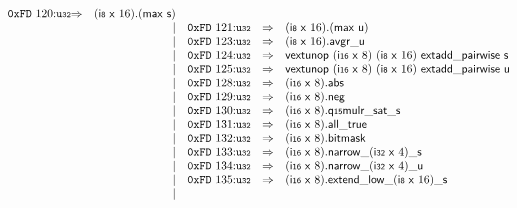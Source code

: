 $$\begin{array}{@{}l@{}rrlll@{}l@{}}
\mathtt{0xFD}~120{:}{\mathtt{u{\scriptstyle32}}} &\Rightarrow& (\mathsf{i{\scriptstyle8}}~\mathsf{x}~16) . (\mathsf{max}~\mathsf{s}) \\ &&|&
\mathtt{0xFD}~121{:}{\mathtt{u{\scriptstyle32}}} &\Rightarrow& (\mathsf{i{\scriptstyle8}}~\mathsf{x}~16) . (\mathsf{max}~\mathsf{u}) \\ &&|&
\mathtt{0xFD}~123{:}{\mathtt{u{\scriptstyle32}}} &\Rightarrow& (\mathsf{i{\scriptstyle8}}~\mathsf{x}~16) . \mathsf{avgr\_u} \\ &&|&
\mathtt{0xFD}~124{:}{\mathtt{u{\scriptstyle32}}} &\Rightarrow& \mathsf{vextunop}~(\mathsf{i{\scriptstyle16}}~\mathsf{x}~8)~(\mathsf{i{\scriptstyle8}}~\mathsf{x}~16)~\mathsf{extadd\_pairwise}~\mathsf{s} \\ &&|&
\mathtt{0xFD}~125{:}{\mathtt{u{\scriptstyle32}}} &\Rightarrow& \mathsf{vextunop}~(\mathsf{i{\scriptstyle16}}~\mathsf{x}~8)~(\mathsf{i{\scriptstyle8}}~\mathsf{x}~16)~\mathsf{extadd\_pairwise}~\mathsf{u} \\ &&|&
\mathtt{0xFD}~128{:}{\mathtt{u{\scriptstyle32}}} &\Rightarrow& (\mathsf{i{\scriptstyle16}}~\mathsf{x}~8) . \mathsf{abs} \\ &&|&
\mathtt{0xFD}~129{:}{\mathtt{u{\scriptstyle32}}} &\Rightarrow& (\mathsf{i{\scriptstyle16}}~\mathsf{x}~8) . \mathsf{neg} \\ &&|&
\mathtt{0xFD}~130{:}{\mathtt{u{\scriptstyle32}}} &\Rightarrow& (\mathsf{i{\scriptstyle16}}~\mathsf{x}~8) . \mathsf{q{\scriptstyle15}mulr\_sat\_s} \\ &&|&
\mathtt{0xFD}~131{:}{\mathtt{u{\scriptstyle32}}} &\Rightarrow& (\mathsf{i{\scriptstyle16}}~\mathsf{x}~8) . \mathsf{all\_true} \\ &&|&
\mathtt{0xFD}~132{:}{\mathtt{u{\scriptstyle32}}} &\Rightarrow& (\mathsf{i{\scriptstyle16}}~\mathsf{x}~8).\mathsf{bitmask} \\ &&|&
\mathtt{0xFD}~133{:}{\mathtt{u{\scriptstyle32}}} &\Rightarrow& {{{{(\mathsf{i{\scriptstyle16}}~\mathsf{x}~8).\mathsf{narrow}}{\mathsf{\_}}}{(\mathsf{i{\scriptstyle32}}~\mathsf{x}~4)}}{\mathsf{\_}}}{\mathsf{s}} \\ &&|&
\mathtt{0xFD}~134{:}{\mathtt{u{\scriptstyle32}}} &\Rightarrow& {{{{(\mathsf{i{\scriptstyle16}}~\mathsf{x}~8).\mathsf{narrow}}{\mathsf{\_}}}{(\mathsf{i{\scriptstyle32}}~\mathsf{x}~4)}}{\mathsf{\_}}}{\mathsf{u}} \\ &&|&
\mathtt{0xFD}~135{:}{\mathtt{u{\scriptstyle32}}} &\Rightarrow& (\mathsf{i{\scriptstyle16}}~\mathsf{x}~8) . {{{{{{\mathsf{extend}}{\mathsf{\_}}}{\mathsf{low}}}{\mathsf{\_}}}{(\mathsf{i{\scriptstyle8}}~\mathsf{x}~16)}}{\mathsf{\_}}}{\mathsf{s}} \\ &&|&

\end{array}$$
